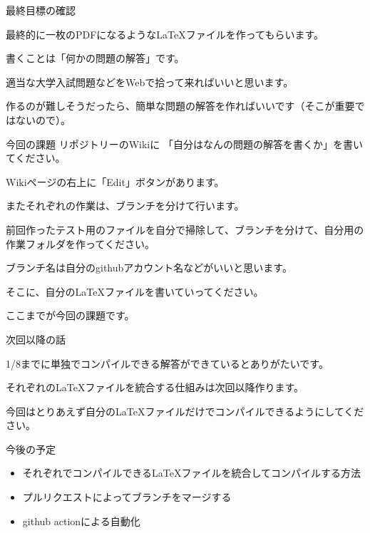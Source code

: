 \documentclass[12pt, unicode]{beamer}
\begin{document}
\begin{frame}{最終目標の確認}

最終的に一枚のPDFになるようなLaTeXファイルを作ってもらいます。

書くことは「何かの問題の解答」です。

適当な大学入試問題などをWebで拾って来ればいいと思います。

作るのが難しそうだったら、簡単な問題の解答を作ればいいです（そこが重要ではないので）。

\end{frame}

\begin{frame}{今回の課題}
リポジトリーのWikiに
「自分はなんの問題の解答を書くか」を書いてください。

Wikiページの右上に「Edit」ボタンがあります。

またそれぞれの作業は、ブランチを分けて行います。

前回作ったテスト用のファイルを自分で掃除して、ブランチを分けて、自分用の作業フォルダを作ってください。

ブランチ名は自分のgithubアカウント名などがいいと思います。

そこに、自分のLaTeXファイルを書いていってください。

ここまでが今回の課題です。

\end{frame}

\begin{frame}[fragile]{次回以降の話}

1/8までに単独でコンパイルできる解答ができているとありがたいです。

それぞれのLaTeXファイルを統合する仕組みは次回以降作ります。

今回はとりあえず自分のLaTeXファイルだけでコンパイルできるようにしてください。

\end{frame}
\begin{frame}{今後の予定}
\begin{itemize}
\item それぞれでコンパイルできるLaTeXファイルを統合してコンパイルする方法
\item プルリクエストによってブランチをマージする
\item github actionによる自動化
\end{itemize}

\end{frame}
\end{document}
